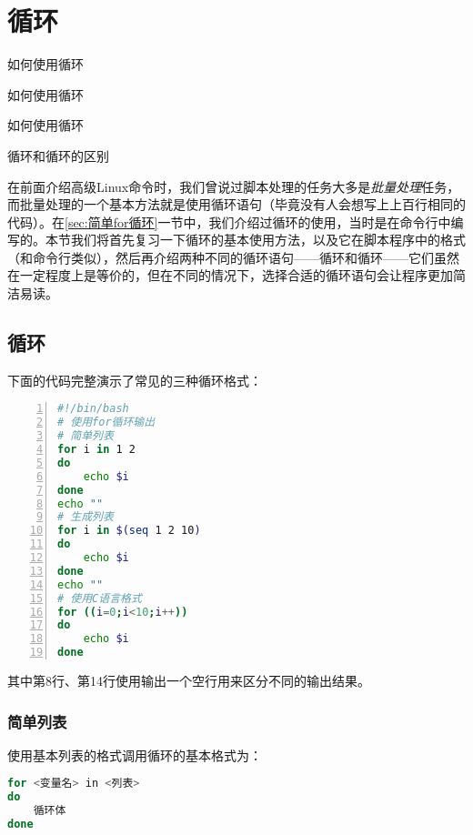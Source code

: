 \section{循环}\label{sec:循环}

\begin{Abstract}
    \item 如何使用循环
    \item 如何使用循环
    \item 如何使用循环
    \item {}循环和循环的区别
\end{Abstract}

在前面介绍高级Linux命令时，我们曾说过脚本处理的任务大多是\emph{批量处理}任务，而批量处理的一个基本方法就是使用循环语句（毕竟没有人会想写上上百行相同的代码）。在\ref{sec:简单for循环}一节中，我们介绍过循环的使用，当时是在命令行中编写的。本节我们将首先复习一下循环的基本使用方法，以及它在脚本程序中的格式（和命令行类似），然后再介绍两种不同的循环语句——循环和循环——它们虽然在一定程度上是等价的，但在不同的情况下，选择合适的循环语句会让程序更加简洁易读。

\subsection{循环}\label{subsec:循环-for循环}

下面的代码完整演示了常见的三种循环格式：

\begin{lstlisting}[language=bash,numbers=left,caption={for\_example}]
#!/bin/bash
# 使用for循环输出
# 简单列表
for i in 1 2
do
    echo $i
done
echo ""
# 生成列表
for i in $(seq 1 2 10)
do
    echo $i
done
echo ""
# 使用C语言格式
for ((i=0;i<10;i++))
do
    echo $i
done
\end{lstlisting}

其中第8行、第14行使用输出一个空行用来区分不同的输出结果。

\subsubsection{简单列表}

使用基本列表的格式调用循环的基本格式为：

\begin{lstlisting}[language=bash]
for <变量名> in <列表>
do
    循环体
done
\end{lstlisting}

